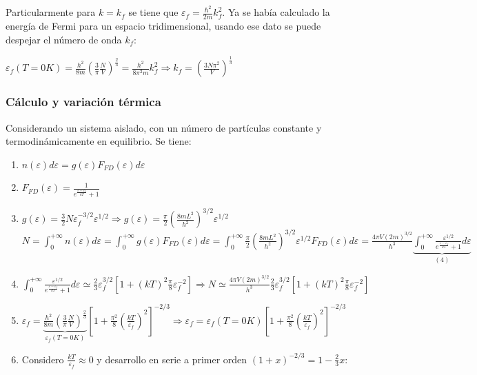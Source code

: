 \documentclass[oneside]{book}
\numberwithin{equation}{section}
\numberwithin{figure}{section}
\numberwithin{table}{section}
\begin{document}
				Particularmente para $k=k_f$ se tiene que $\displaystyle \varepsilon_f=\frac{\hbar^2}{2m}k_f^2$. Ya se había calculado la energía de Fermi para un espacio tridimensional, usando ese dato se puede despejar el número de onda $k_f$:\\
				
				\begin{center}
					$\displaystyle \varepsilon_f(T=0K)=\frac{h^2}{8m}\left(\frac{3}{\pi}\frac{N}{V}\right)^{\frac{2}{3}}=\frac{h^2}{8 \pi^2 m}k_f^2 \Rightarrow k_f=\left(\frac{3N\pi^2}{V}\right)^{\frac{1}{3}}$
				\end{center}
				
				\subsubsection{Cálculo y variación térmica}
				
					Considerando un sistema aislado, con un número de partículas constante y termodinámicamente en equilibrio. Se tiene:\\
					
					\begin{enumerate}
						\item $n(\varepsilon)d\varepsilon=g(\varepsilon)F_{FD}(\varepsilon)d\varepsilon$
						\item $\displaystyle F_{FD}(\varepsilon)=\frac{1}{e^{\frac{\varepsilon-\varepsilon_f}{kT}}+1}$
						\item $\displaystyle g(\varepsilon)=\frac{3}{2}N \varepsilon_f^{-3/2}\varepsilon^{1/2} \Rightarrow g(\varepsilon)=\frac{\pi}{2}\left(\frac{8mL^2}{h^2}\right)^{3/2} \varepsilon^{1/2}$\\
						$\displaystyle N=\int_0^{+\infty} n(\varepsilon)d\varepsilon=\int_0^{+\infty} g(\varepsilon)F_{FD}(\varepsilon)d\varepsilon=\int_0^{+\infty}\frac{\pi}{2}\left(\frac{8mL^2}{h^2}\right)^{3/2} \varepsilon^{1/2} F_{FD}(\varepsilon)d\varepsilon=\frac{4\pi V(2m)^{3/2}}{h^3}\underbrace{\int_0^{+\infty} \frac{\varepsilon^{1/2}}{e^{\frac{\varepsilon-\varepsilon_f}{kT}}+1}d\varepsilon}_{(4)}$\\
						\item $\displaystyle \int_0^{+\infty} \frac{\varepsilon^{1/2}}{e^{\frac{\varepsilon-\varepsilon_f}{kT}}+1}d\varepsilon \simeq \frac{2}{3}\varepsilon_f^{3/2}\left[1+(kT)^2\frac{\pi}{8}\varepsilon_f^{-2} \right] \Rightarrow N \simeq \frac{4\pi V(2m)^{3/2}}{h^3}\frac{2}{3}\varepsilon_f^{3/2}\left[1+(kT)^2\frac{\pi}{8}\varepsilon_f^{-2} \right]$
						\item $\displaystyle \varepsilon_f=\underbrace{\frac{h^2}{8m}\left(\frac{3}{\pi}\frac{N}{V}\right)^{\frac{2}{3}}}_{\varepsilon_f(T=0K)}\left[1+\frac{\pi^2}{8}\left(\frac{kT}{\varepsilon_f}\right)^2\right]^{-2/3} \Rightarrow \varepsilon_f=\varepsilon_f(T=0K)\left[1+\frac{\pi^2}{8}\left(\frac{kT}{\varepsilon_f}\right)^2\right]^{-2/3}$		
						\item Considero $\frac{kT}{\varepsilon_f} \approx 0$ y desarrollo en serie a primer orden $(1+x)^{-2/3}=1-\frac{2}{3}x$: 					
					\end{enumerate}
													
\end{document}
